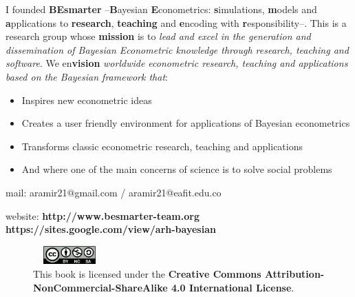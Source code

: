 I founded \textbf{BEsmarter} --\textbf{B}ayesian \textbf{E}conometrics: \textbf{s}imulations, \textbf{m}odels and \textbf{a}pplications to \textbf{research}, \textbf{teaching} and \textbf{e}ncoding with \textbf{r}esponsibility--. This is a research group whose \textbf{mission} is to \textit{lead and excel in the generation and dissemination of Bayesian Econometric knowledge through research, teaching and software}. We en\textbf{vision} \textit{worldwide econometric research, teaching and applications based on the Bayesian framework that}:

\begin{itemize}
	\item Inspires new econometric ideas
	\item Creates a user friendly environment for applications of Bayesian econometrics
	\item Transforms classic econometric research, teaching and applications
	\item And where one of the main concerns of science is to solve social problems    
\end{itemize}

mail: aramir21@gmail.com / aramir21@eafit.edu.co

website: \textbf{http://www.besmarter-team.org} \textbf{https://sites.google.com/view/arh-bayesian}

\begin{figure}[h]
	\includegraphics[width=80pt, height=20pt]{frontmatter/figures/by-nc-sa.png}
	\caption[List of figure caption goes here]{This book is licensed under the \textbf{Creative Commons Attribution-NonCommercial-ShareAlike 4.0 International License}.}\label{fig02}
\end{figure}





